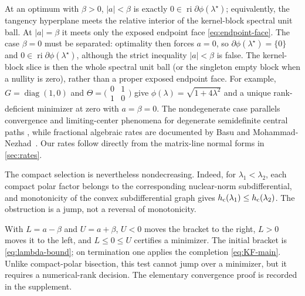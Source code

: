 \begin{remark}
\label{rem:strict-complementarity-main}
At an optimum with \(\beta>0\), \(|a|<\beta\) is exactly
\(0\in\operatorname{ri}\partial\phi(\lambda^\star)\); equivalently, the
tangency hyperplane meets the relative interior of the kernel-block spectral
unit ball.  At \(|a|=\beta\) it meets only the exposed endpoint face
\eqref{eq:endpoint-face}.  The case \(\beta=0\) must be separated:
optimality then forces \(a=0\), so \(\partial\phi(\lambda^\star)=\{0\}\)
and \(0\in\operatorname{ri}\partial\phi(\lambda^\star)\), although the
strict inequality \(|a|<\beta\) is false.  The kernel-block slice is then
the whole spectral unit ball (or the singleton empty block when a nullity
is zero), rather than a proper exposed endpoint face.  For example,
\(G=\operatorname{diag}(1,0)\) and
\(\Theta=\bigl(\begin{smallmatrix}0&1\\1&0\end{smallmatrix}\bigr)\)
give \(\phi(\lambda)=\sqrt{1+4\lambda^2}\) and a unique rank-deficient
minimizer at zero with \(a=\beta=0\).
The nondegenerate case parallels convergence and limiting-center
phenomena for degenerate semidefinite central paths
\citep{halicka2002convergence,halicka2005limiting}, while fractional algebraic
rates are documented by Basu and Mohammad-Nezhad~\cite{basu2022central}.  Our rates follow directly
from the matrix-line normal forms in \cref{sec:rates}.
\end{remark}

The compact selection is nevertheless nondecreasing.  Indeed, for
\(\lambda_1<\lambda_2\), each compact polar factor belongs to the corresponding
nuclear-norm subdifferential, and monotonicity of the convex subdifferential
graph gives \(h_{\rm c}(\lambda_1)\le h_{\rm c}(\lambda_2)\).  The obstruction
is a jump, not a reversal of monotonicity.

\begin{remark}
With \(L=a-\beta\) and \(U=a+\beta\), \(U<0\) moves the bracket to the
right, \(L>0\) moves it to the left, and \(L\le0\le U\) certifies a
minimizer.  The initial bracket is \eqref{eq:lambda-bound}; on termination one
applies the completion \eqref{eq:KF-main}.  Unlike compact-polar bisection,
this test cannot jump over a minimizer, but it requires a numerical-rank
decision.  The elementary convergence proof is recorded in the supplement.
\end{remark}
